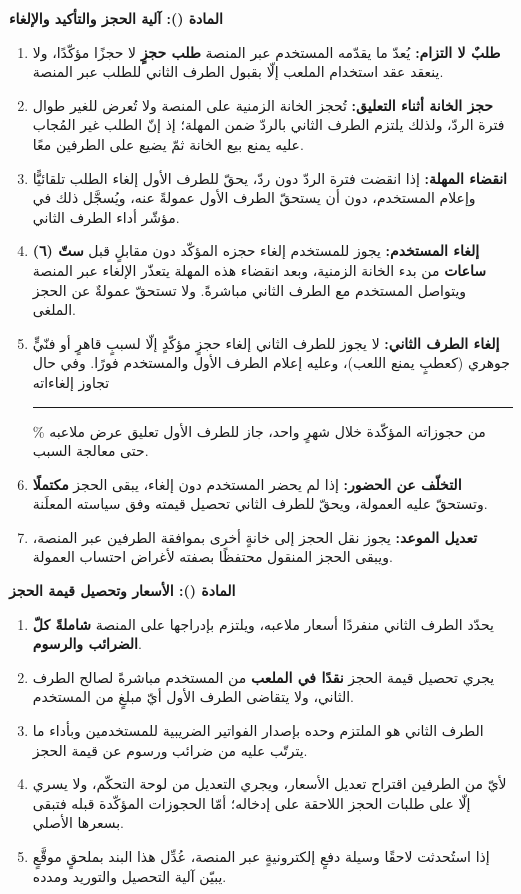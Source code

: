 \documentclass[12pt,a4paper]{article}
\newcounter{bndc}
\newcommand{\bnd}[1]{%
  \vspace{10pt}\par\noindent
  {\color{teal}\bfseries\large المادة (\arabic{bndc}): #1}%
  \stepcounter{bndc}%
  \par\vspace{2pt}\noindent{\color{rule}\rule{\linewidth}{0.6pt}}\par\vspace{4pt}%
}
\newcommand{\blank}[1][3.2cm]{\rule[-0.4ex]{#1}{0.5pt}}
\newcommand{\mlh}[1]{{\bfseries #1}}
\newenvironment{bnditems}
  {\begin{enumerate}[label=\arabic{bndc}.\arabic*,leftmargin=1.6em,itemsep=3pt,topsep=3pt]}
  {\end{enumerate}}
\begin{document}
\bnd{آلية الحجز والتأكيد والإلغاء}\label{art:flow}
\begin{bnditems}
  \item \mlh{طلبٌ لا التزام:} يُعدّ ما يقدّمه المستخدم عبر المنصة \mlh{طلب حجزٍ} لا حجزًا مؤكّدًا، ولا ينعقد عقد استخدام الملعب إلّا بقبول الطرف الثاني للطلب عبر المنصة.
  \item \mlh{حجز الخانة أثناء التعليق:} تُحجز الخانة الزمنية على المنصة ولا تُعرض للغير طوال فترة الردّ، ولذلك يلتزم الطرف الثاني بالردّ ضمن المهلة؛ إذ إنّ الطلب غير المُجاب عليه يمنع بيع الخانة ثمّ يضيع على الطرفين معًا.
  \item \mlh{انقضاء المهلة:} إذا انقضت فترة الردّ دون ردّ، يحقّ للطرف الأول إلغاء الطلب تلقائيًّا وإعلام المستخدم، دون أن يستحقّ الطرف الأول عمولةً عنه، ويُسجَّل ذلك في مؤشّر أداء الطرف الثاني.
  \item \mlh{إلغاء المستخدم:} يجوز للمستخدم إلغاء حجزه المؤكّد دون مقابلٍ قبل \mlh{ستّ (٦) ساعات} من بدء الخانة الزمنية، وبعد انقضاء هذه المهلة يتعذّر الإلغاء عبر المنصة ويتواصل المستخدم مع الطرف الثاني مباشرةً. ولا تستحقّ عمولةٌ عن الحجز الملغى.
  \item \mlh{إلغاء الطرف الثاني:} لا يجوز للطرف الثاني إلغاء حجزٍ مؤكّدٍ إلّا لسببٍ قاهرٍ أو فنّيٍّ جوهري (كعطبٍ يمنع اللعب)، وعليه إعلام الطرف الأول والمستخدم فورًا. وفي حال تجاوز إلغاءاته \blank[1.2cm]\% من حجوزاته المؤكّدة خلال شهرٍ واحد، جاز للطرف الأول تعليق عرض ملاعبه حتى معالجة السبب.
  \item \mlh{التخلّف عن الحضور:} إذا لم يحضر المستخدم دون إلغاء، يبقى الحجز \mlh{مكتملًا} وتستحقّ عليه العمولة، ويحقّ للطرف الثاني تحصيل قيمته وفق سياسته المعلَنة.
  \item \mlh{تعديل الموعد:} يجوز نقل الحجز إلى خانةٍ أخرى بموافقة الطرفين عبر المنصة، ويبقى الحجز المنقول محتفظًا بصفته لأغراض احتساب العمولة.
\end{bnditems}

\bnd{الأسعار وتحصيل قيمة الحجز}
\begin{bnditems}
  \item يحدّد الطرف الثاني منفردًا أسعار ملاعبه، ويلتزم بإدراجها على المنصة \mlh{شاملةً كلّ الضرائب والرسوم}.
  \item يجري تحصيل قيمة الحجز \mlh{نقدًا في الملعب} من المستخدم مباشرةً لصالح الطرف الثاني، ولا يتقاضى الطرف الأول أيّ مبلغٍ من المستخدم.
  \item الطرف الثاني هو الملتزم وحده بإصدار الفواتير الضريبية للمستخدمين وبأداء ما يترتّب عليه من ضرائب ورسوم عن قيمة الحجز.
  \item لأيّ من الطرفين اقتراح تعديل الأسعار، ويجري التعديل من لوحة التحكّم، ولا يسري إلّا على طلبات الحجز اللاحقة على إدخاله؛ أمّا الحجوزات المؤكّدة قبله فتبقى بسعرها الأصلي.
  \item إذا استُحدثت لاحقًا وسيلة دفعٍ إلكترونيةٍ عبر المنصة، عُدِّل هذا البند بملحقٍ موقَّعٍ يبيّن آلية التحصيل والتوريد ومدده.
\end{bnditems}
\end{document}
